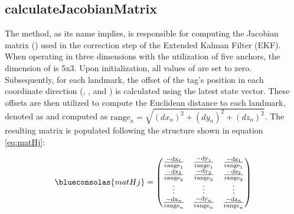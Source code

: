 \subsection{calculateJacobianMatrix}
\label{sub:calculateJacobianMatrix}
The   method, as its name implies, is responsible for computing the Jacobian matrix () used in the correction step of the Extended Kalman Filter (EKF). When operating in three dimensions with the utilization of five anchors, the dimension of  is 5x3.
\vspace{4pt}
\newline
Upon initialization, all values of  are set to zero. Subsequently, for each landmark, the offset of the tag's position in each coordinate direction (, , and ) is calculated using the latest state vector. These offsets are then utilized to compute the Euclidean distance to each landmark, denoted as  and computed as $\textrm{range}_n = \sqrt{(dx_n)^2 + (dy_n)^2 + (dz_n)^2}$.
\vspace{4pt}
\newline
The resulting  matrix is populated following the structure shown in equation \ref{eq:matHj}:

\begin{equation}
	\begin{centering}
		\blueconsolas{matHj} =
		\begin{pmatrix}
			\frac{-\textrm{dx}_1}{\textrm{range}_1} & \frac{-\textrm{dy}_1}{\textrm{range}_1} & \frac{-\textrm{dz}_1}{\textrm{range}_1} \\
			\frac{-\textrm{dx}_2}{\textrm{range}_2} & \frac{-\textrm{dy}_2}{\textrm{range}_2} & \frac{-\textrm{dz}_2}{\textrm{range}_2} \\
			\vdots & \vdots & \vdots \\
			\frac{-\textrm{dx}_n}{\textrm{range}_n} & \frac{-\textrm{dy}_n}{\textrm{range}_n} & \frac{-\textrm{dz}_n}{\textrm{range}_n} \\
		\end{pmatrix}
	\end{centering}
	\label{eq:matHj}
\end{equation}

